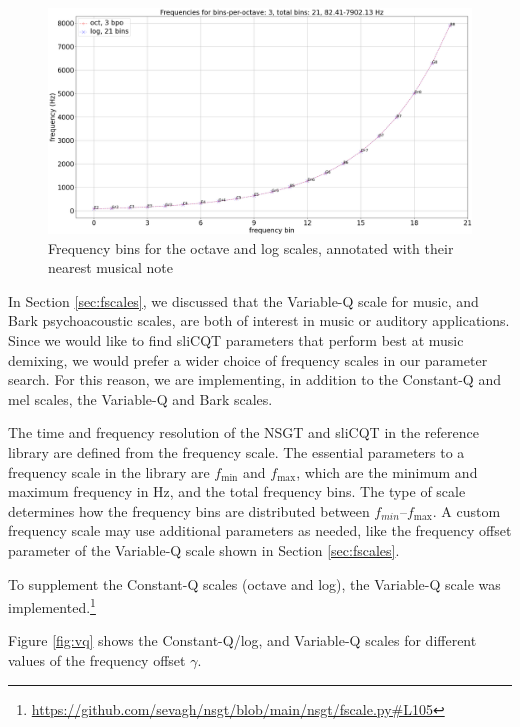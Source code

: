 \documentclass[report.tex]{subfiles}
\begin{document}
\begin{figure}[ht]
	\centering
	\includegraphics[width=\textwidth]{./images-freqscales/log_vs_oct.png}
	\caption{Frequency bins for the octave and log scales, annotated with their nearest musical note}
	\label{fig:octvlog}
\end{figure}

In Section \ref{sec:fscales}, we discussed that the Variable-Q scale for music, and Bark psychoacoustic scales, are both of interest in music or auditory applications. Since we would like to find sliCQT parameters that perform best at music demixing, we would prefer a wider choice of frequency scales in our parameter search. For this reason, we are implementing, in addition to the Constant-Q and mel scales, the Variable-Q and Bark scales.

The time and frequency resolution of the NSGT and sliCQT in the reference library are defined from the frequency scale. The essential parameters to a frequency scale in the library are $f_{\text{min}}$ and $f_{\text{max}}$, which are the minimum and maximum frequency in Hz, and the total frequency bins. The type of scale determines how the frequency bins are distributed between $f_{min}$--$f_{\text{max}}$. A custom frequency scale may use additional parameters as needed, like the frequency offset parameter of the Variable-Q scale shown in Section \ref{sec:fscales}.

To supplement the Constant-Q scales (octave and log), the Variable-Q scale was implemented.\footnote{\url{https://github.com/sevagh/nsgt/blob/main/nsgt/fscale.py\#L105}}

Figure \ref{fig:vq} shows the Constant-Q/log, and Variable-Q scales for different values of the frequency offset $\gamma$.
\end{document}

